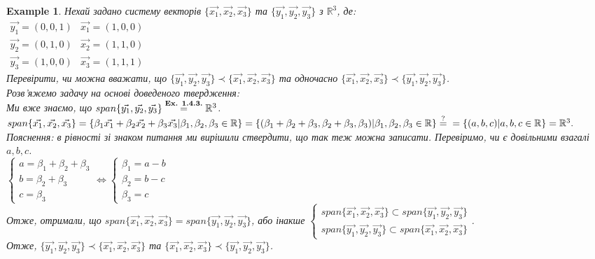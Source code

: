\documentclass[a4paper, 10pt]{article}
\theoremstyle{theoremdd}
\theoremstyle{theoremdd}
\theoremstyle{theoremdd}
\theoremstyle{theoremdd}
\newtheorem{example}[theorem]{Example}
\theoremstyle{theoremdd}
\theoremstyle{theoremdd}
\theoremstyle{theoremdd}
\theoremstyle{theoremdd}
\begin{document}
	\begin{example}
	Нехай задано систему векторів $\{\vec{x_1},\vec{x_2},\vec{x_3}\}$ та $\{\vec{y_1},\vec{y_2},\vec{y_3}\}$ з $\mathbb{R}^3$, де:\\
	$\begin{matrix}
	\vec{y_1} = (0,0,1) & \vec{x_1} = (1,0,0) \\
	\vec{y_2} = (0,1,0) & \vec{x_2} = (1,1,0) \\
	\vec{y_3} = (1,0,0) & \vec{x_3} = (1,1,1)
	\end{matrix}
	$\\
	Перевірити, чи можна вважати, що $\{\vec{y_1}, \vec{y_2}, \vec{y_3}\} \prec \{\vec{x_1}, \vec{x_2}, \vec{x_3}\}$ та одночасно $\{\vec{x_1}, \vec{x_2}, \vec{x_3}\} \prec \{\vec{y_1}, \vec{y_2}, \vec{y_3}\}$.\\
	Розв'яжемо задачу на основі доведеного твердження:\\
	Ми вже знаємо, що $span\{\vec{y_1},\vec{y_2},\vec{y_3}\} \overset{\textrm{\textbf{Ex. 1.4.3.}}}{=} \mathbb{R}^3$.\\
	$span\{\vec{x_1},\vec{x_2},\vec{x_3}\} = \{\beta_1 \vec{x_1} + \beta_2 \vec{x_2} +\beta_3 \vec{x_3} | \beta_1, \beta_2, \beta_3 \in \mathbb{R} \} = \{(\beta_1+\beta_2+\beta_3, \beta_2+\beta_3, \beta_3) | \beta_1, \beta_2, \beta_3 \in \mathbb{R} \} \overset{\textrm{?}}{=} \\ = \{(a,b,c) | a,b,c \in \mathbb{R} \} = \mathbb{R}^3.$\\
	Пояснення: в рівності зі знаком питання ми вирішили ствердити, що так теж можна записати. Перевіримо, чи є довільними взагалі $a,b,c$.\\
	$\begin{cases}
	a = \beta_1 + \beta_2 + \beta_3\\
	b = \beta_2 + \beta_3\\
	c = \beta_3
	\end{cases} \iff
	\begin{cases}
	\beta_1 = a -b\\
	\beta_2 = b - c\\
	\beta_3 = c
	\end{cases}
	$\\
	Отже, отримали, що $span \{\vec{x_1},\vec{x_2},\vec{x_3}\} = span \{\vec{y_1},\vec{y_2},\vec{y_3}\}$, або інакше $\begin{cases} span \{\vec{x_1},\vec{x_2},\vec{x_3}\} \subset span \{\vec{y_1},\vec{y_2},\vec{y_3}\} \\ span \{\vec{y_1},\vec{y_2},\vec{y_3}\} \subset span \{\vec{x_1},\vec{x_2},\vec{x_3}\} \end{cases}$.\\
	Отже, $\{\vec{y_1}, \vec{y_2}, \vec{y_3}\} \prec \{\vec{x_1}, \vec{x_2}, \vec{x_3}\}$ та $\{\vec{x_1}, \vec{x_2}, \vec{x_3}\} \prec \{\vec{y_1}, \vec{y_2}, \vec{y_3}\}$.
	\end{example}
	
\end{document}

